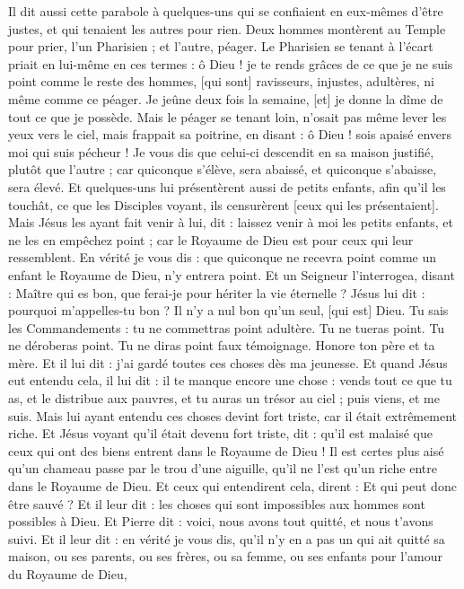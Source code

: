 \begin{multicols}{2}
Il dit aussi cette parabole à quelques-uns qui se confiaient en eux-mêmes d'être justes, et qui tenaient les autres pour rien.
Deux hommes montèrent au Temple pour prier, l'un Pharisien ; et l'autre, péager.
Le Pharisien se tenant à l'écart priait en lui-même en ces termes : ô Dieu ! je te rends grâces de ce que je ne suis point comme le reste des hommes, [qui sont] ravisseurs, injustes, adultères, ni même comme ce péager.
Je jeûne deux fois la semaine, [et] je donne la dîme de tout ce que je possède.
Mais le péager se tenant loin, n'osait pas même lever les yeux vers le ciel, mais frappait sa poitrine, en disant : ô Dieu ! sois apaisé envers moi qui suis pécheur !
Je vous dis que celui-ci descendit en sa maison justifié, plutôt que l'autre ; car quiconque s'élève, sera abaissé, et quiconque s'abaisse, sera élevé.
Et quelques-uns lui présentèrent aussi de petits enfants, afin qu'il les touchât, ce que les Disciples voyant, ils censurèrent [ceux qui les présentaient].
Mais Jésus les ayant fait venir à lui, dit : laissez venir à moi les petits enfants, et ne les en empêchez point ; car le Royaume de Dieu est pour ceux qui leur ressemblent.
En vérité je vous dis : que quiconque ne recevra point comme un enfant le Royaume de Dieu, n'y entrera point.
Et un Seigneur l'interrogea, disant : Maître qui es bon, que ferai-je pour hériter la vie éternelle ?
Jésus lui dit : pourquoi m'appelles-tu bon ? Il n'y a nul bon qu'un seul, [qui est] Dieu.
Tu sais les Commandements : tu ne commettras point adultère. Tu ne tueras point. Tu ne déroberas point. Tu ne diras point faux témoignage. Honore ton père et ta mère.
Et il lui dit : j'ai gardé toutes ces choses dès ma jeunesse.
Et quand Jésus eut entendu cela, il lui dit : il te manque encore une chose : vends tout ce que tu as, et le distribue aux pauvres, et tu auras un trésor au ciel ; puis viens, et me suis.
Mais lui ayant entendu ces choses devint fort triste, car il était extrêmement riche.
Et Jésus voyant qu'il était devenu fort triste, dit : qu'il est malaisé que ceux qui ont des biens entrent dans le Royaume de Dieu !
Il est certes plus aisé qu'un chameau passe par le trou d'une aiguille, qu'il ne l'est qu'un riche entre dans le Royaume de Dieu.
Et ceux qui entendirent cela, dirent : Et qui peut donc être sauvé ?
Et il leur dit : les choses qui sont impossibles aux hommes sont possibles à Dieu.
Et Pierre dit : voici, nous avons tout quitté, et nous t'avons suivi.
Et il leur dit : en vérité je vous dis, qu'il n'y en a pas un qui ait quitté sa maison, ou ses parents, ou ses frères, ou sa femme, ou ses enfants pour l'amour du Royaume de Dieu,

\end{multicols}
